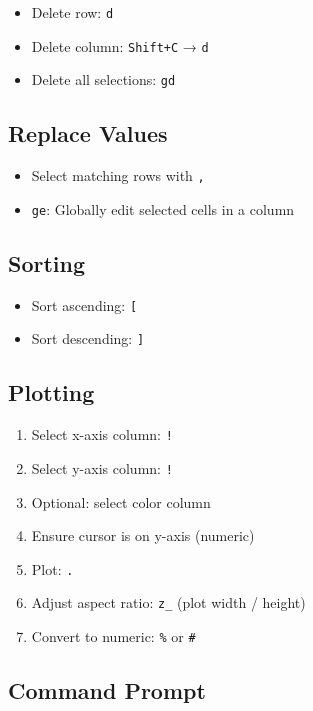 \documentclass[
  letterpaper,
  DIV=11,
  numbers=noendperiod]{scrartcl}
\providecommand{\tightlist}{%
  \setlength{\itemsep}{0pt}\setlength{\parskip}{0pt}}\usepackage{longtable,booktabs,array}
\begin{document}
\begin{itemize}
\tightlist
\item
  Delete row: \texttt{d}
\item
  Delete column: \texttt{Shift+C} → \texttt{d}
\item
  Delete all selections: \texttt{gd}
\end{itemize}

\subsection{Replace Values}\label{replace-values}

\begin{itemize}
\tightlist
\item
  Select matching rows with \texttt{,}
\item
  \texttt{ge}: Globally edit selected cells in a column
\end{itemize}

\subsection{Sorting}\label{sorting}

\begin{itemize}
\tightlist
\item
  Sort ascending: \texttt{{[}}
\item
  Sort descending: \texttt{{]}}
\end{itemize}

\subsection{Plotting}\label{plotting}

\begin{enumerate}
\def\labelenumi{\arabic{enumi}.}
\tightlist
\item
  Select x-axis column: \texttt{!}
\item
  Select y-axis column: \texttt{!}
\item
  Optional: select color column
\item
  Ensure cursor is on y-axis (numeric)
\item
  Plot: \texttt{.}
\item
  Adjust aspect ratio: \texttt{z\_} (plot width / height)
\item
  Convert to numeric: \texttt{\%} or \texttt{\#}
\end{enumerate}

\subsection{Command Prompt}\label{command-prompt}
\end{document}
